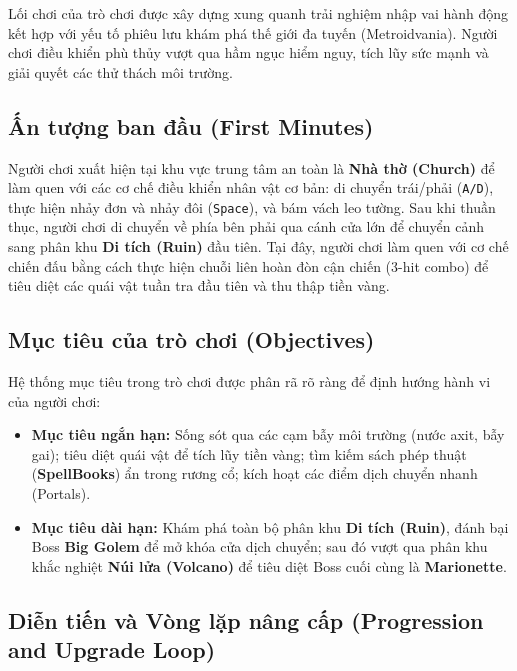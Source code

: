 \documentclass[../DoAn.tex]{subfiles}
\begin{document}
Lối chơi của trò chơi được xây dựng xung quanh trải nghiệm nhập vai hành động kết hợp với yếu tố phiêu lưu khám phá thế giới đa tuyến (Metroidvania). Người chơi điều khiển phù thủy vượt qua hầm ngục hiểm nguy, tích lũy sức mạnh và giải quyết các thử thách môi trường.

\subsection{Ấn tượng ban đầu (First Minutes)}
\label{subsection:3.2.1}

Người chơi xuất hiện tại khu vực trung tâm an toàn là \textbf{Nhà thờ (Church)} để làm quen với các cơ chế điều khiển nhân vật cơ bản: di chuyển trái/phải (\texttt{A/D}), thực hiện nhảy đơn và nhảy đôi (\texttt{Space}), và bám vách leo tường. Sau khi thuần thục, người chơi di chuyển về phía bên phải qua cánh cửa lớn để chuyển cảnh sang phân khu \textbf{Di tích (Ruin)} đầu tiên. Tại đây, người chơi làm quen với cơ chế chiến đấu bằng cách thực hiện chuỗi liên hoàn đòn cận chiến (3-hit combo) để tiêu diệt các quái vật tuần tra đầu tiên và thu thập tiền vàng.

\subsection{Mục tiêu của trò chơi (Objectives)}
\label{subsection:3.2.2}

Hệ thống mục tiêu trong trò chơi được phân rã rõ ràng để định hướng hành vi của người chơi:
\begin{itemize}
    \item \textbf{Mục tiêu ngắn hạn:} Sống sót qua các cạm bẫy môi trường (nước axit, bẫy gai); tiêu diệt quái vật để tích lũy tiền vàng; tìm kiếm sách phép thuật (\textbf{SpellBooks}) ẩn trong rương cổ; kích hoạt các điểm dịch chuyển nhanh (Portals).
    \item \textbf{Mục tiêu dài hạn:} Khám phá toàn bộ phân khu \textbf{Di tích (Ruin)}, đánh bại Boss \textbf{Big Golem} để mở khóa cửa dịch chuyển; sau đó vượt qua phân khu khắc nghiệt \textbf{Núi lửa (Volcano)} để tiêu diệt Boss cuối cùng là \textbf{Marionette}.
\end{itemize}

\subsection{Diễn tiến và Vòng lặp nâng cấp (Progression and Upgrade Loop)}
\label{subsection:3.2.3}
\end{document}
